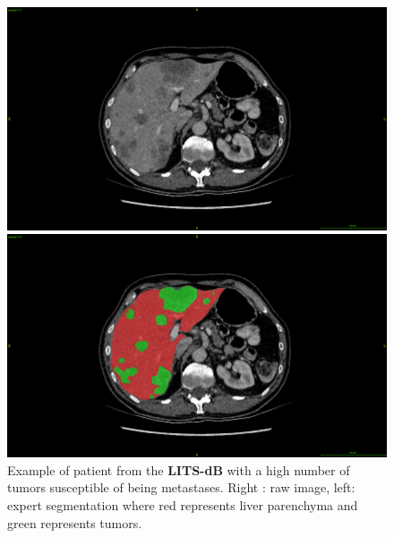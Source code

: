 \documentclass[]{article}
\newcommand{\lmttfont}[1]{{\fontfamily{lmtt}\selectfont #1}}
\begin{document}
\begin{figure}[!ht]
	\centering
	\begin{minipage}{0.45\linewidth}
		\includegraphics[width=\linewidth]{../Contributions/images/ResizeLITS_examplePatientMeta}
	\end{minipage} \hspace{-0.1cm}
	\begin{minipage}{0.45\linewidth}
		\includegraphics[width=\linewidth]{../Contributions/images/ResizeLITS_examplePatientMeta_seg}
	\end{minipage}
	\caption{Example of patient from the \textbf{\lmttfont{LITS-dB}} with a high number of tumors susceptible of being metastases. Right : raw image, left: expert segmentation where red represents liver parenchyma and green represents tumors.}
	\label{fig:litsDb_meta}
\end{figure}
\end{document}

